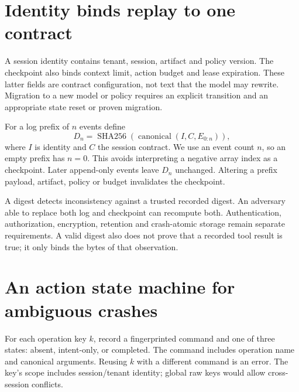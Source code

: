 \section{Identity binds replay to one contract}
A session identity contains tenant, session, artifact and policy version.
The checkpoint also binds context limit, action budget and lease expiration.
These latter fields are contract configuration, not text that the model may
rewrite. Migration to a new model or policy requires an explicit transition
and an appropriate state reset or proven migration.

For a log prefix of $n$ events define
\begin{equation}\label{evod49:digest}
D_n=\operatorname{SHA256}(\operatorname{canonical}(I,C,E_{0:n})),
\end{equation}
where $I$ is identity and $C$ the session contract. We use an event count $n$,
so an empty prefix has $n=0$. This avoids interpreting a negative array index
as a checkpoint. Later append-only events leave $D_n$ unchanged. Altering a
prefix payload, artifact, policy or budget invalidates the checkpoint.

A digest detects inconsistency against a trusted recorded digest. An adversary
able to replace both log and checkpoint can recompute both. Authentication,
authorization, encryption, retention and crash-atomic storage remain separate
requirements. A valid digest also does not prove that a recorded tool result
is true; it only binds the bytes of that observation.

\section{An action state machine for ambiguous crashes}
For each operation key $k$, record a fingerprinted command and one of three
states: absent, intent-only, or completed. The command includes operation name
and canonical arguments. Reusing $k$ with a different command is an error.
The key's scope includes session/tenant identity; global raw keys would allow
cross-session conflicts.


